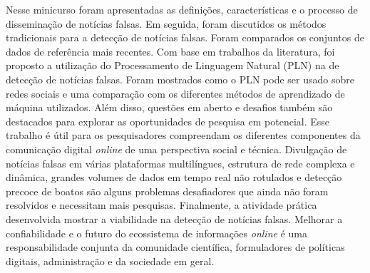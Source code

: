 \documentclass{SBCbookchapter}
\begin{document}
Nesse minicurso foram apresentadas as definições, características e o processo de disseminação de notícias falsas. Em seguida, foram discutidos os métodos tradicionais para a detecção de notícias falsas. Foram comparados os conjuntos de dados de referência mais recentes. Com base em trabalhos da literatura, foi proposto a utilização do Processamento de Linguagem Natural (PLN) na de detecção de notícias falsas. Foram mostrados como o PLN pode ser usado sobre redes sociais e uma comparação com os diferentes métodos de aprendizado de máquina utilizados.
Além disso, questões em aberto e desafios também são destacados para explorar as oportunidades de pesquisa em potencial. Esse trabalho é útil para os pesquisadores compreendam os diferentes componentes da comunicação digital \textit{online} de uma perspectiva social e técnica. Divulgação de notícias falsas em várias plataformas multilíngues, estrutura de rede complexa e dinâmica, grandes volumes de dados em tempo real não rotulados e detecção precoce de boatos são alguns problemas desafiadores que ainda não foram resolvidos e necessitam mais pesquisas. 
Finalmente, a atividade prática desenvolvida mostrar a viabilidade na detecção de notícias falsas.
Melhorar a confiabilidade e o futuro do ecossistema de informações \textit{online} é uma responsabilidade conjunta da comunidade científica, formuladores de políticas digitais, administração e da sociedade em geral.









\end{document}
